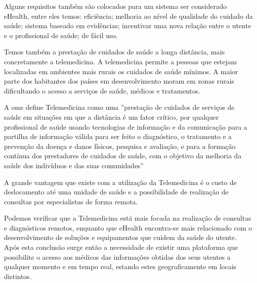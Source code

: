 \par
Alguns requisitos tamb\'em s\~ao colocados \cite{ehealth} para um sistema ser considerado eHealth, entre eles temos: efici\^encia; melhoria ao n\'ivel de qualidade do cuidado da sa\'ude; sistema baseado em evid\^encias; incentivar uma nova rela\c c\~ao entre o utente e o profissional de sa\'ude; de f\'acil uso.
\par
Temos também a presta\c c\~ao de cuidados de sa\'ude a longa dist\^ancia, mais concretamente a telemedicina. A telemedicina permite a pessoas que estejam localizadas em ambientes mais rurais os cuidados de sa\'ude m\'inimos. A maior parte dos habitantes dos pa\'ises em desenvolvimento moram em zonas rurais dificultando o acesso a servi\c cos de sa\'ude, m\'edicos e tratamentos.
\par
A \gls{oms} define Telemedicina como \cite{ehealth_telemedicine} uma ''presta\c c\~ao de cuidados de servi\c cos de sa\'ude em situa\c c\~oes em que a dist\^ancia \'e um fator cr\'itico, por qualquer profissional de sa\'ude usando tecnologias de informa\c c\~ao e da comunica\c c\~ao para a partilha de informa\c c\~ao v\'alida para ser feito o diagn\'ostico, o tratamento e a preven\c c\~ao da doen\c ca e danos f\'isicos, pesquisa e avalia\c c\~ao, e para a forma\c c\~ao cont\'inua dos prestadores de cuidados de sa\'ude, com o objetivo da melhoria da sa\'ude dos indiv\'iduos e das suas comunidades''
\par
A grande vantagem que existe com a utiliza\c c\~ao da Telemedicina \'e o custo de deslocamento at\'e uma unidade de sa\'ude e a possibilidade de realiza\c c\~ao de consultas por especialistas de forma remota.
\par
Podemos verificar que a Telemedicina est\'a mais focada na realiza\c c\~ao de consultas e diagn\'osticos remotos, enquanto que eHealth encontra-se mais relacionado com o desenvolvimento de solu\c c\~oes e equipamentos que cuidem da sa\'ude do utente. Ap\'os esta conclus\~ao surge ent\~ao a necessidade de existir uma plataforma que possibilite o acesso aos m\'edicos das informa\c c\~oes obtidas dos seus utentes a qualquer momento e em tempo real, estando estes geograficamente em locais distintos.





